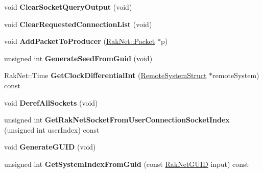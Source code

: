 \begin{DoxyCompactItemize}
\item 
\hypertarget{class_rak_net_1_1_rak_peer_a931de9ed5552e8924bb6a21d2940a208}{void {\bfseries Clear\-Socket\-Query\-Output} (void)}\label{class_rak_net_1_1_rak_peer_a931de9ed5552e8924bb6a21d2940a208}

\item 
\hypertarget{class_rak_net_1_1_rak_peer_af995c3b6043762999e3378701be44add}{void {\bfseries Clear\-Requested\-Connection\-List} (void)}\label{class_rak_net_1_1_rak_peer_af995c3b6043762999e3378701be44add}

\item 
\hypertarget{class_rak_net_1_1_rak_peer_a15b43b26a5c0edd6edbae79cd1659455}{void {\bfseries Add\-Packet\-To\-Producer} (\hyperlink{struct_rak_net_1_1_packet}{Rak\-Net\-::\-Packet} $\ast$p)}\label{class_rak_net_1_1_rak_peer_a15b43b26a5c0edd6edbae79cd1659455}

\item 
\hypertarget{class_rak_net_1_1_rak_peer_a2efc0eeb6c9aa8ae2e98e3eec1924b12}{unsigned int {\bfseries Generate\-Seed\-From\-Guid} (void)}\label{class_rak_net_1_1_rak_peer_a2efc0eeb6c9aa8ae2e98e3eec1924b12}

\item 
\hypertarget{class_rak_net_1_1_rak_peer_ac45fe4d814e46854f97e87e0de856865}{Rak\-Net\-::\-Time {\bfseries Get\-Clock\-Differential\-Int} (\hyperlink{struct_rak_net_1_1_rak_peer_1_1_remote_system_struct}{Remote\-System\-Struct} $\ast$remote\-System) const }\label{class_rak_net_1_1_rak_peer_ac45fe4d814e46854f97e87e0de856865}

\item 
\hypertarget{class_rak_net_1_1_rak_peer_a23c730ac03982e229ede92146f24b3ae}{void {\bfseries Deref\-All\-Sockets} (void)}\label{class_rak_net_1_1_rak_peer_a23c730ac03982e229ede92146f24b3ae}

\item 
\hypertarget{class_rak_net_1_1_rak_peer_a73511daf31b178024333e55e23fa4291}{unsigned int {\bfseries Get\-Rak\-Net\-Socket\-From\-User\-Connection\-Socket\-Index} (unsigned int user\-Index) const }\label{class_rak_net_1_1_rak_peer_a73511daf31b178024333e55e23fa4291}

\item 
\hypertarget{class_rak_net_1_1_rak_peer_a97750c3e07e66c6077b89e58612a5b4a}{void {\bfseries Generate\-G\-U\-I\-D} (void)}\label{class_rak_net_1_1_rak_peer_a97750c3e07e66c6077b89e58612a5b4a}

\item 
\hypertarget{class_rak_net_1_1_rak_peer_a6f978b64c6712ea6f16c44da51baad00}{unsigned int {\bfseries Get\-System\-Index\-From\-Guid} (const \hyperlink{struct_rak_net_1_1_rak_net_g_u_i_d}{Rak\-Net\-G\-U\-I\-D} input) const }\label{class_rak_net_1_1_rak_peer_a6f978b64c6712ea6f16c44da51baad00}


\end{DoxyCompactItemize}
